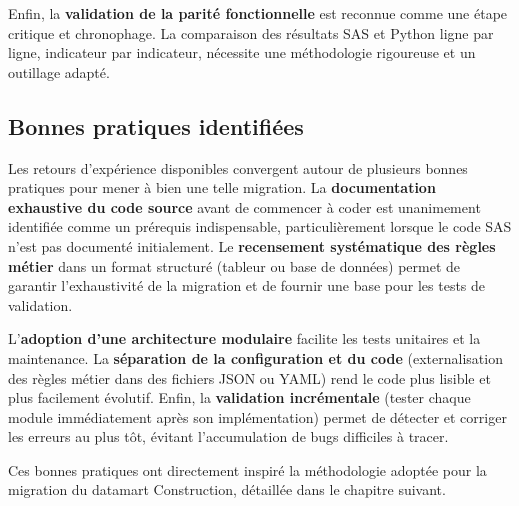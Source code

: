 Enfin, la \textbf{validation de la parité fonctionnelle} est reconnue comme une étape critique et chronophage. La comparaison des résultats SAS et Python ligne par ligne, indicateur par indicateur, nécessite une méthodologie rigoureuse et un outillage adapté.

\subsection{Bonnes pratiques identifiées}

Les retours d'expérience disponibles convergent autour de plusieurs bonnes pratiques pour mener à bien une telle migration. La \textbf{documentation exhaustive du code source} avant de commencer à coder est unanimement identifiée comme un prérequis indispensable, particulièrement lorsque le code SAS n'est pas documenté initialement. Le \textbf{recensement systématique des règles métier} dans un format structuré (tableur ou base de données) permet de garantir l'exhaustivité de la migration et de fournir une base pour les tests de validation.

L'\textbf{adoption d'une architecture modulaire} facilite les tests unitaires et la maintenance. La \textbf{séparation de la configuration et du code} (externalisation des règles métier dans des fichiers JSON ou YAML) rend le code plus lisible et plus facilement évolutif. Enfin, la \textbf{validation incrémentale} (tester chaque module immédiatement après son implémentation) permet de détecter et corriger les erreurs au plus tôt, évitant l'accumulation de bugs difficiles à tracer.

Ces bonnes pratiques ont directement inspiré la méthodologie adoptée pour la migration du datamart Construction, détaillée dans le chapitre suivant.
